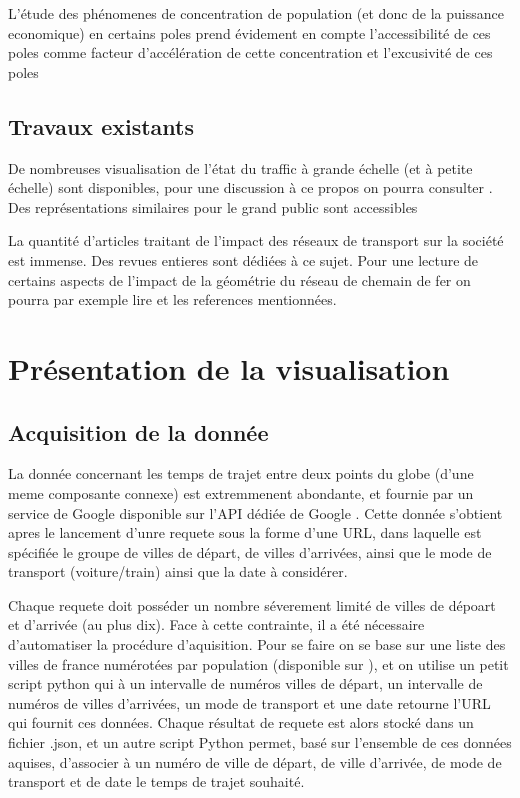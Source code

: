 \documentclass{vgtc}                          %
\begin{document}
L'étude des phénomenes de concentration de population (et donc de la puissance economique) en certains poles prend évidement en compte l'accessibilité de ces poles comme facteur d'accélération de cette concentration et l'excusivité de ces poles 

\subsection{Travaux existants}

De nombreuses visualisation de l'état du traffic à grande échelle (et à petite échelle) sont disponibles, pour une discussion à ce propos on pourra consulter \cite{schoedon2016interactive}. 
Des représentations similaires pour le grand public sont accessibles \cite{LeMonde1}


La quantité d'articles traitant de l'impact des réseaux de transport sur la société est immense. Des revues entieres sont dédiées à ce sujet. Pour une lecture de certains aspects de l'impact de la géométrie du réseau de chemain de fer on pourra par exemple lire \cite{cao2017investigating} et les references mentionnées.


\section{Présentation de la visualisation}

\vspace{0.3cm}

\subsection{Acquisition de la donnée}

\vspace{0.3cm}

La donnée concernant les temps de trajet entre deux points du globe (d'une meme composante connexe) est extremmenent abondante, et fournie par un service de Google disponible sur l'API dédiée de Google \cite{APIGoogle}. Cette donnée s'obtient apres le lancement d'unre requete sous la forme d'une URL, dans laquelle est spécifiée le groupe de villes de départ, de villes d'arrivées, ainsi que le mode de transport (voiture/train) ainsi que la date à considérer. 

Chaque requete doit posséder un nombre séverement limité de villes de dépoart et d'arrivée (au plus dix). Face à cette contrainte, il a été nécessaire d'automatiser la procédure d'aquisition. Pour se faire on se base sur une liste des villes de france numérotées par population (disponible sur ), et on utilise un petit script python qui à un intervalle de numéros villes de départ, un intervalle de numéros de villes d'arrivées, un mode de transport et une date retourne l'URL qui fournit ces données. Chaque résultat de requete est alors stocké dans un fichier .json, et un autre script Python permet, basé sur l'ensemble de ces données aquises, d'associer à un numéro de ville de départ, de ville d'arrivée, de mode de transport et de date le temps de trajet souhaité. 
\end{document}
